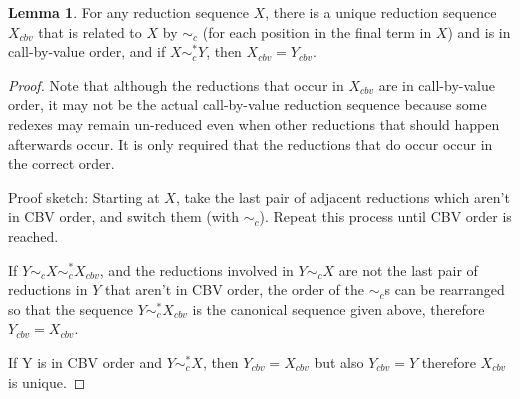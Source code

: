 \documentclass{article}
\theoremstyle{definition}
\theoremstyle{lemma}
\newtheorem{lemma}{Lemma}
\theoremstyle{remark}
\begin{document}
\begin{lemma} \label{canonicalCousins}
For any reduction sequence $X$, there is a unique reduction sequence $X_{cbv}$ that is related to $X$ by $\sim_c$ (for each position in the final term in $X$) and is in call-by-value order, and if $X \sim_c^* Y$, then $X_{cbv} = Y_{cbv}$.
\end{lemma}
\begin{proof}
Note that although the reductions that occur in $X_{cbv}$ are in call-by-value order, it may not be the actual call-by-value reduction sequence because some redexes may remain un-reduced even when other reductions that should happen afterwards occur. It is only required that the reductions that do occur occur in the correct order.

Proof sketch:
Starting at $X$, take the last pair of adjacent reductions which aren't in CBV order, and switch them (with $\sim_c$). Repeat this process until CBV order is reached.

If $Y \sim_c X \sim_c^* X_{cbv}$, and the reductions involved in $Y \sim_c X$ are not the last pair of reductions in $Y$ that aren't in CBV order, the order of the $\sim_c$s can be rearranged so that the sequence $Y \sim_c^* X_{cbv}$ is the canonical sequence given above, therefore $Y_{cbv} = X_{cbv}$.

If Y is in CBV order and $Y \sim_c^* X$, then $Y_{cbv} = X_{cbv}$ but also $Y_{cbv} = Y$ therefore $X_{cbv}$ is unique.
\end{proof}
\end{document}
